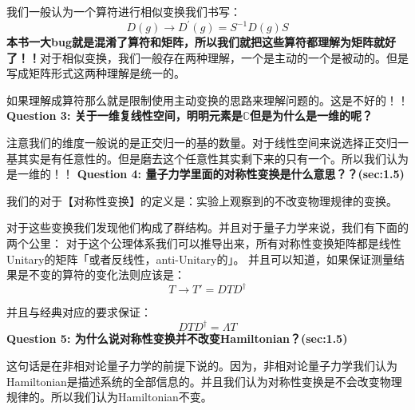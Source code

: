   我们一般认为一个算符进行相似变换我们书写：
  \begin{equation}
   D(g)\to D^{\prime}(g)=S^{-1}D(g)S 
    \label{eq:smilaritytrans}
  \end{equation}
\textbf{本书一大bug就是混淆了算符和矩阵，所以我们就把这些算符都理解为矩阵就好了！！}对于相似变换，我们一般存在两种理解，一个是主动的一个是被动的。但是写成矩阵形式这两种理解是统一的。

如果理解成算符那么就是限制使用主动变换的思路来理解问题的。这是不好的！！
\line
\textbf{Question 3: 关于一维复线性空间，明明元素是$ \mathbb{C} $但是为什么是一维的呢？}

注意我们的维度一般说的是正交归一的基的数量。对于线性空间来说选择正交归一基其实是有任意性的。但是磨去这个任意性其实剩下来的只有一个。所以我们认为是一维的！！
\line
\textbf{Question 4: 量子力学里面的对称性变换是什么意思？？(sec:1.5)}

我们的对于【对称性变换】的定义是：实验上观察到的不改变物理规律的变换。

对于这些变换我们发现他们构成了群结构。并且对于量子力学来说，我们有下面的两个公里：
对于这个公理体系我们可以推导出来，所有对称性变换矩阵都是线性Unitary的矩阵「或者反线性，anti-Unitary的」。  并且可以知道，如果保证测量结果是不变的算符的变化法则应该是：
\begin{equation}
  T \to T' = D T D^{\dagger}
  \label{eq:operatortrans}
\end{equation}

并且与经典对应的要求保证：
\begin{equation}
  D T D^{\dagger} = \Lambda T
  \label{eq:tenoroperatortrans}
\end{equation}
\line
\textbf{Question 5: 为什么说对称性变换并不改变Hamiltonian？(sec:1.5)}

这句话是在非相对论量子力学的前提下说的。因为，非相对论量子力学我们认为Hamiltonian是描述系统的全部信息的。并且我们认为对称性变换是不会改变物理规律的。所以我们认为Hamiltonian不变。


